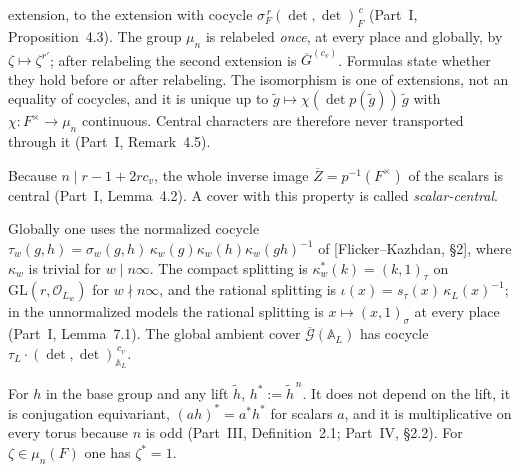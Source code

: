 \begin{description}
{extension}, to the extension with cocycle
$\sigma_F^{\,r}(\det,\det)_F^{\,c}$ (Part~I, Proposition~4.3).  The
group $\mu_n$ is relabeled \emph{once}, at every place and globally,
by $\zeta\mapsto\zeta^{r'}$; after relabeling the second extension is
$\overline G^{(c_v)}$.  Formulas state whether they hold before or
after relabeling.  The isomorphism is one of extensions, not an
equality of cocycles, and it is unique up to
$\tilde g\mapsto\chi(\det p(\tilde g))\,\tilde g$ with
$\chi:F^\times\to\mu_n$ continuous.  Central characters are therefore
never transported through it (Part~I, Remark~4.5).
\item[Scalar centrality] Because $n\mid r-1+2rc_v$, the whole inverse
image $\overline Z=p^{-1}(F^\times)$ of the scalars is central
(Part~I, Lemma~4.2).  A cover with this property is called
\emph{scalar-central}.
\item[Global normalization] Globally one uses the normalized cocycle
$\tau_w(g,h)=\sigma_w(g,h)\,\kappa_w(g)\kappa_w(h)\kappa_w(gh)^{-1}$
of [Flicker--Kazhdan, \S2], where $\kappa_w$ is trivial for $w\mid
n\infty$.  The compact splitting is $\kappa^*_w(k)=(k,1)_\tau$ on
$\mathrm{GL}(r,\mathcal O_{L_w})$ for $w\nmid n\infty$, and the
rational splitting is $\iota(x)=s_\tau(x)\,\kappa_L(x)^{-1}$; in the
unnormalized models the rational splitting is $x\mapsto(x,1)_\sigma$
at every place (Part~I, Lemma~7.1).  The global ambient cover
$\overline{\mathcal G}(\mathbb A_L)$ has cocycle
$\tau_L\cdot(\det,\det)_{\mathbb A_L}^{\,c_v}$.
\item[Star map] For $h$ in the base group and any lift $\tilde h$,
$h^*:=\tilde h^{\,n}$.  It does not depend on the lift, it is
conjugation equivariant, $(ah)^*=a^*h^*$ for scalars $a$, and it is
multiplicative on every torus because $n$ is odd (Part~III,
Definition~2.1; Part~IV, \S2.2).  For $\zeta\in\mu_n(F)$ one has
$\zeta^*=1$.
\end{description}

